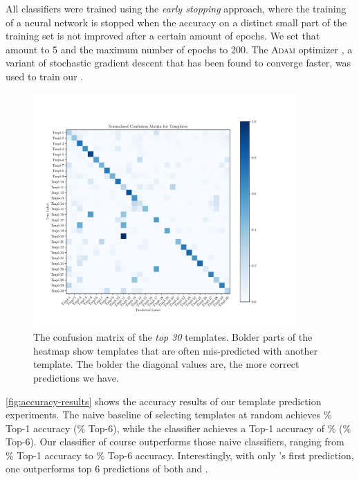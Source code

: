 All classifiers were trained using the \emph{early stopping} approach, where the
training of a neural network is stopped when the accuracy on a distinct small
part of the training set is not improved after a certain amount of epochs. We
set that amount to 5 and the maximum number of epochs to 200. The \textsc{Adam}
optimizer \citep{Kingma2014-ng}, a variant of stochastic gradient descent that
has been found to converge faster, was used to train our \dnn.



\begin{figure}[t]
  \centering
  \includegraphics[trim={10 10 100 70},clip,width=0.9\textwidth]{evaluation-conf-matrix.pdf}
  \caption{The confusion matrix of the \emph{top 30} templates. Bolder parts of
  the heatmap show templates that are often mis-predicted with another template.
  The bolder the diagonal values are, the more correct predictions we have.}
  \label{fig:conf-matrix}
\end{figure}

\autoref{fig:accuracy-results} shows the accuracy results of our template
prediction experiments. The naive baseline of selecting templates at random
achieves \RandomTopOne\% Top-1 accuracy (\RandomTopSix\% Top-6), while the
\popular classifier achieves a Top-1 accuracy of \PopularTopOne\%
(\PopularTopSix\% Top-6). Our \dnn classifier of course outperforms those naive
classifiers, ranging from \DnnTopOne\% Top-1 accuracy to \DnnTopSix\% Top-6
accuracy. Interestingly, with only \dnn's first prediction, one outperforms top
6 predictions of both \random and \popular.

